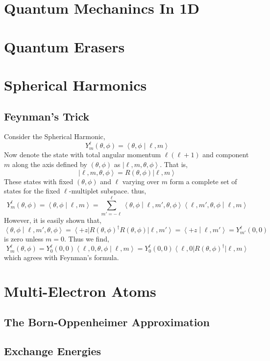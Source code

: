 \documentclass[12pt]{extarticle}
\theoremstyle{definition}
\newcommand{\inner}[2]{\left< #1 \middle| #2 \right>}
\newcommand{\ket}[1]{\left| #1 \right>}
\newcommand{\bra}[1]{\left< #1 \right|}
\begin{document}
\section{Quantum Mechanincs In 1D}

\section{Quantum Erasers}

\section{Spherical Harmonics}

\subsection{Feynman's Trick}

Consider the Spherical Harmonic,
\[ Y^\ell_m(\theta, \phi) = \inner{\theta, \phi}{\ell, m} \]
Now denote the state with total angular momentum $\ell(\ell + 1)$ and component $m$ along the axis defined by $(\theta, \phi)$ as $\ket{\ell, m, \theta, \phi}$. That is,
\[ \ket{\ell, m, \theta, \phi} = R(\theta, \phi) \ket{\ell, m} \]
 These states with fixed $(\theta, \phi)$ and $\ell$ varying over $m$ form a complete set of states for the fixed $\ell$-multiplet subspace. thus,
\[ Y^\ell_m(\theta, \phi) = \inner{\theta, \phi}{\ell, m} = \sum_{m' = - \ell}^\ell \inner{\theta, \phi}{\ell, m', \theta, \phi} \inner{\ell, m', \theta, \phi}{\ell, m} \]
However, it is easily shown that,
\[ \inner{\theta, \phi}{\ell, m', \theta, \phi}  = \bra{+z} R(\theta, \phi)^\dagger R(\theta, \phi) \ket{\ell, m'} = \inner{+z}{\ell, m'} = Y^\ell_{m'}(0,0) \]
is zero unless $m = 0$. Thus we find,
\[ Y^{\ell}_m(\theta, \phi) = Y^\ell_{0}(0,0) \inner{\ell, 0, \theta, \phi}{\ell, m} = Y^\ell_{0}(0,0) \bra{\ell, 0} R(\theta, \phi)^\dagger \ket{\ell, m} \]
which agrees with Feynman's formula. 

\section{Multi-Electron Atoms}

\subsection{The Born-Oppenheimer Approximation}

\subsection{Exchange Energies}
\end{document}

